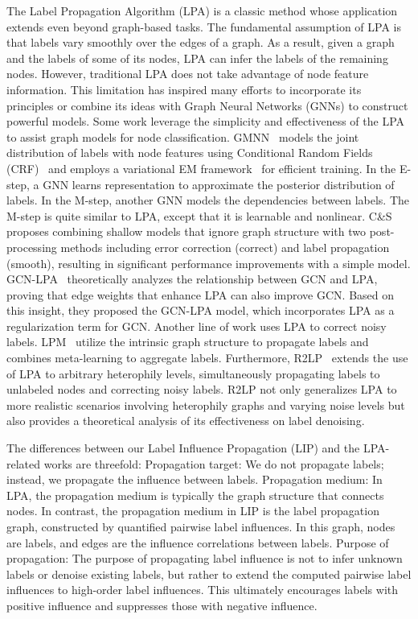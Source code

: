 The Label Propagation Algorithm (LPA) is a classic method whose application extends even beyond graph-based tasks. The fundamental assumption of LPA is that labels vary smoothly over the edges of a graph. As a result, given a graph and the labels of some of its nodes, LPA can infer the labels of the remaining nodes.
However, traditional LPA does not take advantage of node feature information. This limitation has inspired many efforts to incorporate its principles or combine its ideas with Graph Neural Networks (GNNs) to construct powerful models.
Some work leverage the simplicity and effectiveness of the LPA to assist graph models for node classification.
GMNN~\cite{qu2019gmnn} models the joint distribution of labels with node features using Conditional Random Fields (CRF)~\cite{lafferty2001conditional} and employs a variational EM framework~\cite{neal1998view} for efficient training. In the E-step, a GNN learns representation to approximate the posterior distribution of labels. In the M-step, another GNN models the dependencies between labels. The M-step is quite similar to LPA, except that it is learnable and nonlinear.
C\&S~\cite{huang2020combining} proposes combining shallow models that ignore graph structure with two post-processing methods including error correction (correct) and label propagation (smooth), resulting in significant performance improvements with a simple model.
GCN-LPA~\cite{wang2021combining} theoretically analyzes the relationship between GCN and LPA, proving that edge weights that enhance LPA can also improve GCN. Based on this insight, they proposed the GCN-LPA model, which incorporates LPA as a regularization term for GCN.
Another line of work uses LPA to correct noisy labels.
LPM~\cite{xia2021towards} utilize the intrinsic graph structure to propagate labels and combines meta-learning to aggregate labels.
Furthermore, R2LP~\cite{cheng2024resurrecting} extends the use of LPA to arbitrary heterophily levels, simultaneously propagating labels to unlabeled nodes and correcting noisy labels. R2LP not only generalizes LPA to more realistic scenarios involving heterophily graphs and varying noise levels but also provides a theoretical analysis of its effectiveness on label denoising. 

The differences between our Label Influence Propagation (LIP) and the LPA-related works are threefold: Propagation target: We do not propagate labels; instead, we propagate the influence between labels.
Propagation medium: In LPA, the propagation medium is typically the graph structure that connects nodes. In contrast, the propagation medium in LIP is the label propagation graph, constructed by quantified pairwise label influences. In this graph, nodes are labels, and edges are the influence correlations between labels.
Purpose of propagation: The purpose of propagating label influence is not to infer unknown labels or denoise existing labels, but rather to extend the computed pairwise label influences to high-order label influences. This ultimately encourages labels with positive influence and suppresses those with negative influence.


